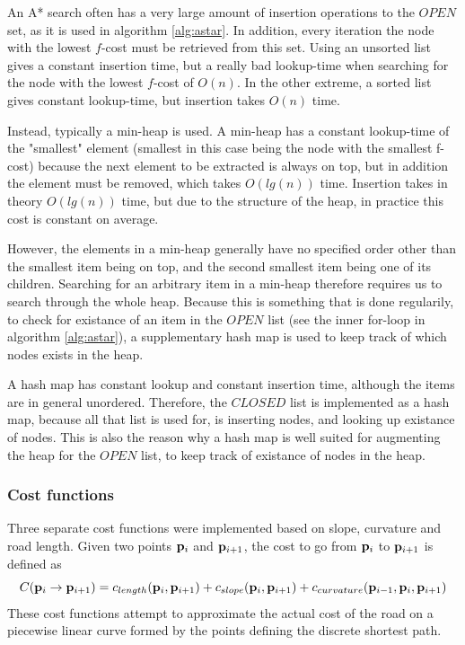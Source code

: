 An A* search often has a very large amount of insertion operations to the $OPEN$ set, as it is used in algorithm \ref{alg:astar}. In addition, every iteration the node with the lowest $f$-cost must be retrieved from this set. Using an unsorted list gives a constant insertion time, but a really bad lookup-time when searching for the node with the lowest $f$-cost of $O(n)$. In the other extreme, a sorted list gives constant lookup-time, but insertion takes $O(n)$ time. 

Instead, typically a min-heap is used. A min-heap has a constant lookup-time of the "smallest" element (smallest in this case being the node with the smallest f-cost) because the next element to be extracted is always on top, but in addition the element must be removed, which takes $O(lg(n))$ time. Insertion takes in theory $O(lg(n))$ time, but due to the structure of the heap, in practice this cost is constant on average. 

However, the elements in a min-heap generally have no specified order other than the smallest item being on top, and the second smallest item being one of its children. Searching for an arbitrary item in a min-heap therefore requires us to search through the whole heap. Because this is something that is done regularily, to check for existance of an item in the $OPEN$ list (see the inner for-loop in algorithm \ref{alg:astar}), a supplementary hash map is used to keep track of which nodes exists in the heap. 

A hash map has constant lookup and constant insertion time, although the items are in general unordered. Therefore, the $CLOSED$ list is implemented as a hash map, because all that list is used for, is inserting nodes, and looking up existance of nodes. This is also the reason why a hash map is well suited for augmenting the heap for the $OPEN$ list, to keep track of existance of nodes in the heap.

\subsubsection{Cost functions}
Three separate cost functions were implemented based on slope, curvature and road length. Given two points ${\mathbf p}_i$ and ${\mathbf p}_{i+1}$, the cost to go from ${\mathbf p}_i$ to ${\mathbf p}_{i+1}$ is defined as 
\begin{equation}
C({\mathbf p}_i \to {\mathbf p}_{i+1}) = c_{length}({\mathbf p}_i, {\mathbf p}_{i+1}) + c_{slope}({\mathbf p}_i, {\mathbf p}_{i+1}) + c_{curvature}({\mathbf p}_{i-1}, {\mathbf p}_i, {\mathbf p}_{i+1})
\label{eq:cost_function_overview}
\end{equation}
These cost functions attempt to approximate the actual cost of the road on a piecewise linear curve formed by the points defining the discrete shortest path. 

